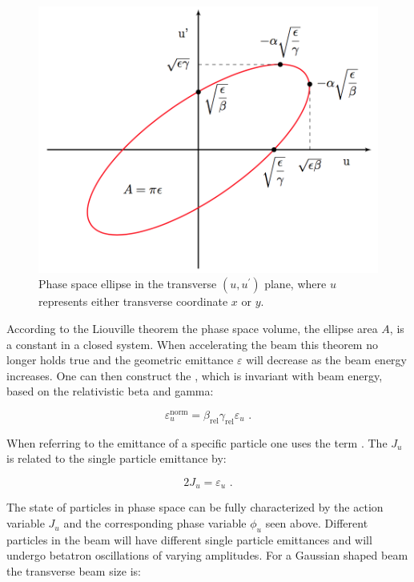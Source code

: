 \begin{figure}[!htb]
    \begin{center}
    \includegraphics[width = 0.75\linewidth]{Figures/Beam_Dynamics_Theory/phase_space.png}
    \caption{Phase space ellipse in the transverse \((u, u^{\prime})\) plane, where \(u\) represents either transverse coordinate \(x\) or \(y\).}
    \label{figure:phase_space_ellipse}
    \end{center}
\end{figure}

According to the Liouville theorem the phase space volume, the ellipse area \(A\), is a constant in a closed system.
When accelerating the beam this theorem no longer holds true and the geometric emittance \(\varepsilon\) will decrease as the beam energy increases.
One can then construct the , which is invariant with beam energy, based on the relativistic beta and gamma:

\begin{equation}
    \varepsilon_u^{\mathrm{norm}} = \beta_{\mathrm{rel}} \gamma_{\mathrm{rel}} \varepsilon_u \text{ .}
    \label{equation:normalized_emittance}
\end{equation}

When referring to the emittance of a specific particle one uses the term .
The  \(J_u\) is related to the single particle emittance by:

\begin{equation}
    2 J_u = \varepsilon_u \text{ .}
    \label{equation:single_particle_action}
\end{equation}

The state of particles in phase space can be fully characterized by the action variable \(J_u\) and the corresponding phase variable \(\phi_u\) seen above. 
Different particles in the beam will have different single particle emittances and will undergo betatron oscillations of varying amplitudes.
For a Gaussian shaped beam the transverse beam size is:%

